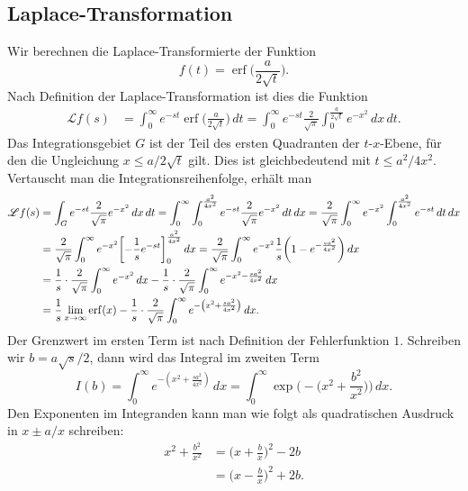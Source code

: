 %
%
\subsection{Laplace-Transformation}
Wir berechnen die Laplace-Transformierte der Funktion
\[
f(t) = \operatorname{erf}\biggl(\frac{a}{2\sqrt{t}}\biggr).
\]
Nach Definition der Laplace-Transformation ist dies die Funktion
\begin{align*}
\mathscr{L}f(s)
&=
\int_0^\infty
e^{-st} \operatorname{erf}\biggl(\frac{a}{2\sqrt{t}}\biggr)
\,dt
=
\int_0^\infty
e^{-st}
\frac{2}{\sqrt{\pi}}
\int_0^{\frac{a}{2\sqrt{t}}}
e^{-x^2}
\,dx
\,dt.
\end{align*}
Das Integrationsgebiet $G$ ist der Teil des ersten Quadranten der
$t$-$x$-Ebene, für den die Ungleichung $x \le a/2\sqrt{t}$ gilt.
Dies ist gleichbedeutend mit $t \le a^2/4x^2$.
Vertauscht man die Integrationsreihenfolge, erhält man
\begin{align}
\mathscr{L}f(s)
&=
\int_G
e^{-st}
\frac{2}{\sqrt{\pi}}
e^{-x^2}
\,dx \,dt
=
\int_0^\infty
\int_0^{\frac{a^2}{4x^2}}
e^{-st}
\frac{2}{\sqrt{\pi}}
e^{-x^2}
\,dt
\,dx
=
\frac{2}{\sqrt{\pi}}
\int_0^\infty
e^{-x^2}
\int_0^{\frac{a^2}{4x^2}}
e^{-st}
\,dt
\,dx
\notag
\\
&=
\frac{2}{\sqrt{\pi}}
\int_0^\infty
e^{-x^2}
\biggl[
-\frac1{s}e^{-st}
\biggr]_0^{\frac{a^2}{4x^2}}
\,dx
=
\frac{2}{\sqrt{\pi}}
\int_0^\infty
e^{-x^2}
\frac1{s}
\biggl(
1-e^{-\frac{sa^2}{4x^2}}
\biggr)
\,dx
\notag
\\
&=
\frac{1}{s}
\cdot
\frac{2}{\sqrt{\pi}}\int_0^\infty e^{-x^2}\,dx
-
\frac1{s}
\cdot
\frac{2}{\sqrt{\pi}}
\int_0^\infty
e^{-x^2-\frac{sa^2}{4x^2}}
\,dx
\notag
\\
&=
\frac1s\lim_{x\to\infty} \operatorname{erf}(x)
-
\frac1s
\cdot
\frac{2}{\sqrt{\pi}}
\int_0^\infty e^{-\left(x^2+\frac{sa^2}{4x^2}\right)}\,dx.
\label{buch:integrale:eqn:laplaceerf}
\end{align}
Der Grenzwert im ersten Term ist nach Definition der Fehlerfunktion $1$. 
Schreiben wir $b=a\sqrt{s}/2$, dann wird das Integral im zweiten Term
\begin{equation}
I(b)
=
\int_0^\infty e^{-\left(x^2+\frac{sa^2}{4x^2}\right)}\,dx
=
\int_0^\infty \exp\biggl(-\biggl(x^2+\frac{b^2}{x^2}\biggr)\biggr)\,dx.
\label{buch:integrale:eqn:Ibsumme}
\end{equation}
Den Exponenten im Integranden kann man wie folgt als quadratischen
Ausdruck in $x\pm a/x$ schreiben:
\begin{equation*}
\begin{aligned}
x^2 + \frac{b^2}{x^2}
&=
\biggl(x+\frac{b}{x}\biggr)^2 - 2b
\\
&=
\biggl(x-\frac{b}{x}\biggr)^2 + 2b.
\end{aligned}
\end{equation*}
